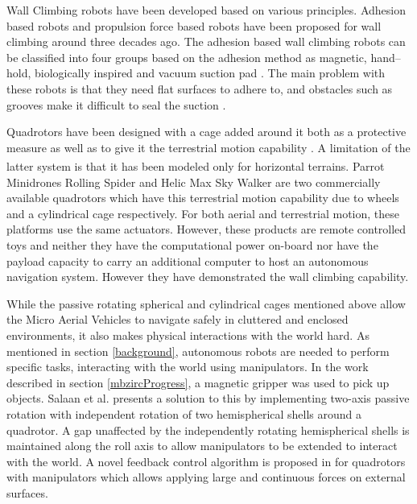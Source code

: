 \documentclass[12pt,a4paper]{report}
\begin{document}
Wall Climbing robots have been developed based on various principles. Adhesion based robots \cite{NISHI1992543} \cite{NISHI1986} and propulsion force based robots \cite{NISHI1991} have been proposed for wall climbing around three decades ago. The adhesion based wall climbing robots can be classified into four groups based on the adhesion method as magnetic, hand–hold, biologically inspired and vacuum suction pad \cite{Koo2013}. The main problem with these robots is that they need flat surfaces to adhere to, and obstacles such as grooves make it difficult to seal the suction \cite{Liu2013}. 

Quadrotors have been designed with a cage added around it both as a protective measure \cite{mulgaonkar2015design} \cite{sadeghzadeh2011fault} as well as to give it the terrestrial motion capability \cite{kalantari2013design}. A limitation of the latter system is that it has been modeled only for horizontal terrains. Parrot \textsuperscript{\textregistered} Minidrones Rolling Spider and Helic Max Sky Walker are two commercially available quadrotors which have this terrestrial motion capability due to wheels and a cylindrical cage respectively. For both aerial and terrestrial motion, these platforms use the same actuators. However, these products are remote controlled toys and neither they have the computational power on-board nor have the payload capacity to carry an additional computer to host an autonomous navigation system. However they have demonstrated the wall climbing capability. 

While the passive rotating spherical and cylindrical cages mentioned above allow the Micro Aerial Vehicles to navigate safely in cluttered and enclosed environments, it also makes physical interactions with the world hard. As mentioned in section \ref{background}, autonomous robots are needed to perform specific tasks, interacting with the world using manipulators. In the work described in section \ref{mbzircProgress}, a magnetic gripper was used to pick up objects. Salaan et al. \cite{salaan2017uav} presents a solution to this by implementing two-axis passive rotation with independent rotation of two hemispherical shells around a quadrotor. A gap unaffected by the independently rotating hemispherical shells is maintained along the roll axis to allow manipulators to be extended to interact with the world. A novel feedback control algorithm is proposed in \cite{wopereis2017application} for quadrotors with manipulators which allows applying large and continuous forces on external surfaces.  
\end{document}

